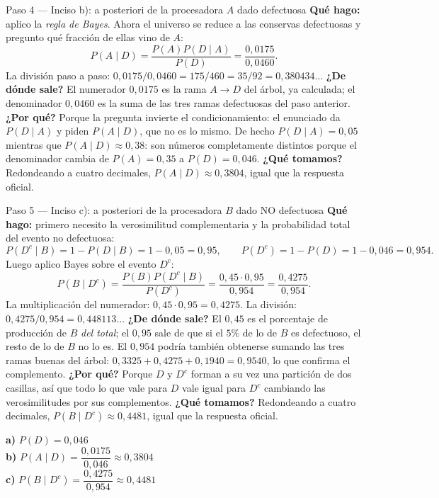 \documentclass[11pt]{article}
\begin{document}
\begin{sol}
\begin{paso}{Paso 4 --- Inciso b): a posteriori de la procesadora $A$ dado defectuosa}
\textbf{Qué hago:} aplico la \emph{regla de Bayes}. Ahora el universo se reduce a las conservas defectuosas y pregunto qué fracción de ellas vino de $A$:
\[
P(A\mid D)=\frac{P(A)P(D\mid A)}{P(D)}=\frac{0,0175}{0,0460}.
\]
La división paso a paso: $0,0175/0,0460=175/460=35/92=0,380434\ldots$
\textbf{¿De dónde sale?} El numerador $0,0175$ es la rama $A\to D$ del árbol, ya calculada; el denominador $0,0460$ es la suma de las tres ramas defectuosas del paso anterior.
\textbf{¿Por qué?} Porque la pregunta invierte el condicionamiento: el enunciado da $P(D\mid A)$ y piden $P(A\mid D)$, que no es lo mismo. De hecho $P(D\mid A)=0,05$ mientras que $P(A\mid D)\approx 0,38$: son números completamente distintos porque el denominador cambia de $P(A)=0,35$ a $P(D)=0,046$.
\textbf{¿Qué tomamos?} Redondeando a cuatro decimales, $P(A\mid D)\approx 0,3804$, igual que la respuesta oficial.
\end{paso}

\begin{paso}{Paso 5 --- Inciso c): a posteriori de la procesadora $B$ dado NO defectuosa}
\textbf{Qué hago:} primero necesito la verosimilitud complementaria y la probabilidad total del evento no defectuosa:
\[
P(D^{c}\mid B)=1-P(D\mid B)=1-0,05=0,95,\qquad P(D^{c})=1-P(D)=1-0,046=0,954.
\]
Luego aplico Bayes sobre el evento $D^{c}$:
\[
P(B\mid D^{c})=\frac{P(B)P(D^{c}\mid B)}{P(D^{c})}=\frac{0,45\cdot 0,95}{0,954}=\frac{0,4275}{0,954}.
\]
La multiplicación del numerador: $0,45\cdot 0,95=0,4275$. La división: $0,4275/0,954=0,448113\ldots$
\textbf{¿De dónde sale?} El $0,45$ es el porcentaje de producción de $B$ \emph{del total}; el $0,95$ sale de que si el $5\%$ de lo de $B$ es defectuoso, el resto de lo de $B$ no lo es. El $0,954$ podría también obtenerse sumando las tres ramas buenas del árbol: $0,3325+0,4275+0,1940=0,9540$, lo que confirma el complemento.
\textbf{¿Por qué?} Porque $D$ y $D^{c}$ forman a su vez una partición de dos casillas, así que todo lo que vale para $D$ vale igual para $D^{c}$ cambiando las verosimilitudes por sus complementos.
\textbf{¿Qué tomamos?} Redondeando a cuatro decimales, $P(B\mid D^{c})\approx 0,4481$, igual que la respuesta oficial.
\end{paso}

\begin{resp}
\textbf{a)} $P(D)=0,046$\\
\textbf{b)} $P(A\mid D)=\dfrac{0,0175}{0,046}\approx 0,3804$\\
\textbf{c)} $P(B\mid D^{c})=\dfrac{0,4275}{0,954}\approx 0,4481$
\end{resp}

\end{sol}
\end{document}

